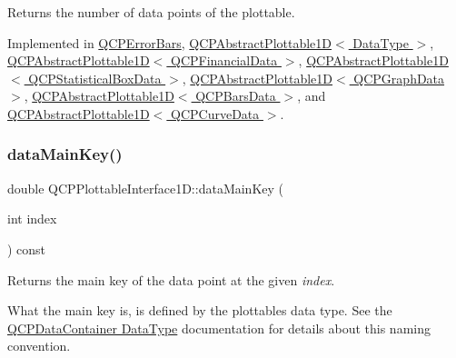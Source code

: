 Returns the number of data points of the plottable. 

Implemented in \hyperlink{classQCPErrorBars_a18b797c62f2af000b926e52eb46d97c7}{Q\+C\+P\+Error\+Bars}, \hyperlink{classQCPAbstractPlottable1D_ab5dd99e4f1621e7dbd63438e0b02984e}{Q\+C\+P\+Abstract\+Plottable1\+D$<$ Data\+Type $>$}, \hyperlink{classQCPAbstractPlottable1D_ab5dd99e4f1621e7dbd63438e0b02984e}{Q\+C\+P\+Abstract\+Plottable1\+D$<$ Q\+C\+P\+Financial\+Data $>$}, \hyperlink{classQCPAbstractPlottable1D_ab5dd99e4f1621e7dbd63438e0b02984e}{Q\+C\+P\+Abstract\+Plottable1\+D$<$ Q\+C\+P\+Statistical\+Box\+Data $>$}, \hyperlink{classQCPAbstractPlottable1D_ab5dd99e4f1621e7dbd63438e0b02984e}{Q\+C\+P\+Abstract\+Plottable1\+D$<$ Q\+C\+P\+Graph\+Data $>$}, \hyperlink{classQCPAbstractPlottable1D_ab5dd99e4f1621e7dbd63438e0b02984e}{Q\+C\+P\+Abstract\+Plottable1\+D$<$ Q\+C\+P\+Bars\+Data $>$}, and \hyperlink{classQCPAbstractPlottable1D_ab5dd99e4f1621e7dbd63438e0b02984e}{Q\+C\+P\+Abstract\+Plottable1\+D$<$ Q\+C\+P\+Curve\+Data $>$}.

\mbox{\label{classQCPPlottableInterface1D_a2bd60daaac046945fead558cbd83cf73}} 
\subsubsection{\texorpdfstring{data\+Main\+Key()}{dataMainKey()}}
{\footnotesize\ttfamily double Q\+C\+P\+Plottable\+Interface1\+D\+::data\+Main\+Key (\begin{DoxyParamCaption}\item[{int}]{index }\end{DoxyParamCaption}) const\hspace{0.3cm}{\ttfamily [pure virtual]}}

Returns the main key of the data point at the given {\itshape index}.

What the main key is, is defined by the plottable\textquotesingle{}s data type. See the \hyperlink{classQCPDataContainer_qcpdatacontainer-datatype}{Q\+C\+P\+Data\+Container Data\+Type} documentation for details about this naming convention. 


